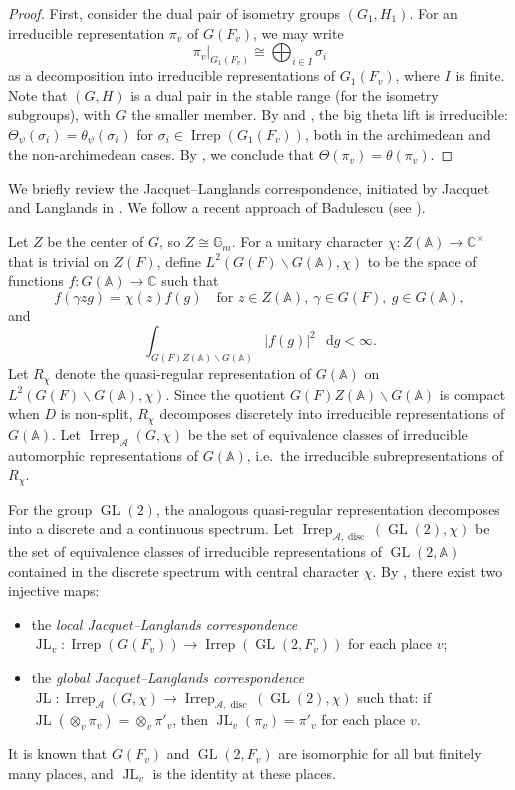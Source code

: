 \documentclass[11pt]{article}
\theoremstyle{plain}
\theoremstyle{remark}
\theoremstyle{definition}
\newcommand*\dd{\mathop{}\!\mathrm{d}}
\DeclareMathOperator{\GL}{GL}
\DeclareMathOperator{\JL}{JL}
\DeclareMathOperator{\disc}{disc}
\DeclareMathOperator{\irr}{Irrep}
\begin{document}
\begin{proof}
First, consider the dual pair of isometry groups $(G_1,H_1)$.
For an irreducible representation $\pi_v$ of $G(F_v)$, we may write
\[
\pi_v|_{G_1(F_v)}\cong \bigoplus_{i\in I}\sigma_i
\]
as a decomposition into irreducible representations of $G_{1}(F_v)$, where $I$ is finite.
Note that $(G,H)$ is a dual pair in the stable range (for the isometry subgroups), with $G$ the smaller member.
By \cite[Theorem~A]{LokeMa2015} and \cite[Corollary~7.3]{ChenZou2024}, the big theta lift is irreducible:
$\Theta_{\psi}(\sigma_i)=\theta_{\psi}(\sigma_i)$ for $\sigma_i\in \irr(G_{1}(F_v))$, both in the archimedean and the non-archimedean cases.
By \cite[Lemma~2.2(iii)]{GanTak2011}, we conclude that $\Theta(\pi_v)=\theta(\pi_v)$.
\end{proof}

We briefly review the Jacquet--Langlands correspondence, initiated by Jacquet and Langlands in \cite{JL70}.
We follow a recent approach of Badulescu (see \cite{Badu08}).

Let $Z$ be the center of $G$, so $Z\cong \mathbb{G}_m$.
For a unitary character $\chi\colon Z(\mathbb{A})\to \mathbb{C}^{\times}$ that is trivial on $Z(F)$, define $L^2(G(F)\backslash G(\mathbb{A}),\chi)$ to be the space of functions $f\colon G(\mathbb{A})\to \mathbb{C}$ such that
\[
f(\gamma z g)=\chi(z)f(g)\quad \text{for } z\in Z(\mathbb{A}),\ \gamma\in G(F),\ g\in G(\mathbb{A}),
\]
and
\[
\int_{G(F)Z(\mathbb{A})\backslash G(\mathbb{A})}|f(g)|^2\,\dd g<\infty.
\]
Let $R_{\chi}$ denote the quasi-regular representation of $G(\mathbb{A})$ on $L^2(G(F)\backslash G(\mathbb{A}),\chi)$.
Since the quotient $G(F)Z(\mathbb{A})\backslash G(\mathbb{A})$ is compact when $D$ is non-split, $R_{\chi}$ decomposes discretely into irreducible representations of $G(\mathbb{A})$.
Let $\irr_{\mathcal{A}}(G,\chi)$ be the set of equivalence classes of irreducible automorphic representations of $G(\mathbb{A})$, i.e.\ the irreducible subrepresentations of $R_{\chi}$.

For the group $\GL(2)$, the analogous quasi-regular representation decomposes into a discrete and a continuous spectrum.
Let $\irr_{\mathcal{A},\disc}(\GL(2),\chi)$ be the set of equivalence classes of irreducible representations of $\GL(2,\mathbb{A})$ contained in the discrete spectrum with central character $\chi$.
By \cite[Theorem~5.1]{Badu08}, there exist two injective maps:
\begin{itemize}
\item the \emph{local Jacquet--Langlands correspondence} $\JL_{v}\colon \irr(G(F_v))\to \irr(\GL(2,F_v))$ for each place $v$;
\item the \emph{global Jacquet--Langlands correspondence} $\JL\colon \irr_{\mathcal{A}}(G,\chi)\to\irr_{\mathcal{A},\disc}(\GL(2),\chi)$ such that:
if $\JL(\otimes_{v}\pi_v)=\otimes_{v}\pi'_v$, then $\JL_{v}(\pi_v)=\pi'_{v}$ for each place $v$.
\end{itemize}
It is known that $G(F_v)$ and $\GL(2,F_v)$ are isomorphic for all but finitely many places, and $\JL_v$ is the identity at these places.
\end{document}
